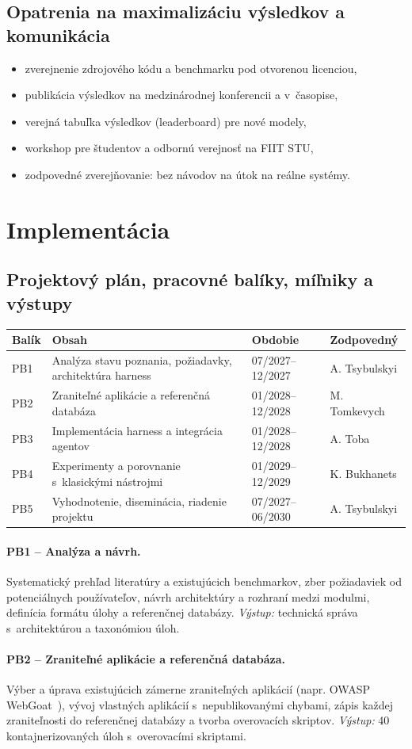 \documentclass[11pt,a4paper]{article}
\newcommand{\bod}[1]{\subsection*{#1}}
\begin{document}
\bod{Opatrenia na maximalizáciu výsledkov a komunikácia}
\begin{itemize}
  \item zverejnenie zdrojového kódu a benchmarku pod otvorenou licenciou,
  \item publikácia výsledkov na medzinárodnej konferencii a v~časopise,
  \item verejná tabuľka výsledkov (leaderboard) pre nové modely,
  \item workshop pre študentov a odbornú verejnosť na FIIT STU,
  \item zodpovedné zverejňovanie: bez návodov na útok na reálne systémy.
\end{itemize}

\section{Implementácia}

\bod{Projektový plán, pracovné balíky, míľniky a výstupy}
\noindent
\begin{tabularx}{\textwidth}{@{}lXll@{}}
\toprule
\textbf{Balík} & \textbf{Obsah} & \textbf{Obdobie} & \textbf{Zodpovedný} \\ \midrule
PB1 & Analýza stavu poznania, požiadavky, architektúra harness & 07/2027--12/2027 & A. Tsybulskyi \\
PB2 & Zraniteľné aplikácie a referenčná databáza & 01/2028--12/2028 & M. Tomkevych \\
PB3 & Implementácia harness a integrácia agentov & 01/2028--12/2028 & A. Toba \\
PB4 & Experimenty a porovnanie s~klasickými nástrojmi & 01/2029--12/2029 & K. Bukhanets \\
PB5 & Vyhodnotenie, diseminácia, riadenie projektu & 07/2027--06/2030 & A. Tsybulskyi \\ \bottomrule
\end{tabularx}

\paragraph{PB1 -- Analýza a návrh.} Systematický prehľad literatúry a existujúcich benchmarkov, zber požiadaviek od potenciálnych používateľov, návrh architektúry a rozhraní medzi modulmi, definícia formátu úlohy a referenčnej databázy. \emph{Výstup:} technická správa s~architektúrou a taxonómiou úloh.

\paragraph{PB2 -- Zraniteľné aplikácie a referenčná databáza.} Výber a úprava existujúcich zámerne zraniteľných aplikácií (napr. OWASP WebGoat~\cite{OWASP-WebGoat}), vývoj vlastných aplikácií s~nepublikovanými chybami, zápis každej zraniteľnosti do referenčnej databázy a tvorba overovacích skriptov. \emph{Výstup:} 40 kontajnerizovaných úloh s~overovacími skriptami.
\end{document}
